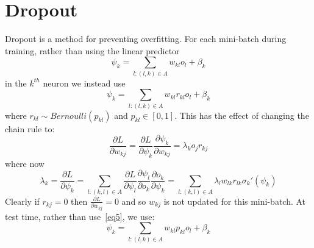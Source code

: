 \documentclass[11pt]{article}
\begin{document}
\section{Dropout}
Dropout is a method for preventing overfitting. For each mini-batch during training, rather than using the linear predictor
\begin{equation} \label{eq5}
\psi _{k} = \sum_{l : \left( l , k \right) \in A} w_{kl} o_{l} + \beta_k
\end{equation}
in the $k^{th}$ neuron we instead use
\begin{equation} \label{eq6}
\psi _{k} = \sum_{l : \left( l , k \right) \in A} w_{kl} r_{kl} o_{l} + \beta_k
\end{equation}
where $r_{kl} \sim Bernoulli(p_{kl})$ and $p_{kl} \in \left[ 0,1 \right]$. This has the effect of changing the chain rule to:
\begin{equation}
\frac{\partial L}{\partial w_{kj}} = \frac{\partial L}{\partial \psi _{k}} \frac{\partial \psi _{k}}{\partial w_{kj}} = \lambda _{k} o_{j} r_{kj}
\end{equation}
where now
\begin{equation}
\lambda _{k} = \frac{\partial L}{\partial \psi _{k}} = \sum_{l : \left( k , l \right) \in A}\frac{\partial L}{\partial \psi _{l}} \frac{\partial \psi _{l}}{\partial o_{k}} \frac{\partial o_{k}}{\partial \psi _{k}} = \sum_{l : \left( k , l \right) \in A} \lambda _{l} w_{lk} r_{lk} \sigma_{k}' \left( \psi _{k} \right)
\end{equation}
Clearly if $r_{kj}=0$ then $\frac{\partial L}{\partial w_{kj}}=0$ and so $w_{kj}$ is not updated for this mini-batch.
At test time, rather than use~\eqref{eq5}, we use:
\begin{equation} \label{dropoutTest}
\psi _{k} = \sum_{l : \left( l , k \right) \in A} w_{kl} p_{kl} o_{l} + \beta_k
\end{equation}
\end{document}
